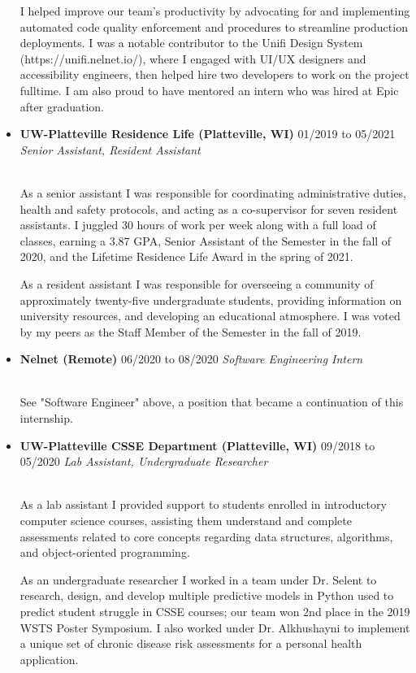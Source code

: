 \documentclass[11pt]{article}
\newcommand{\job}[3]{\vspace{1.5mm}
  \textbf{#1} \hfill #2 \linebreak \textit{#3}
}
\begin{document}
\begin{itemize}[leftmargin=*]
{I helped improve our team's productivity by advocating for and implementing automated code quality
enforcement and procedures to streamline production deployments. I was a notable contributor to the Unifi Design System (https://unifi.nelnet.io/), where I engaged with UI/UX designers and accessibility engineers, then helped hire two developers to work on the project fulltime. I am also proud to have mentored an intern who was hired at Epic after graduation.}
	\item[]
	      \job
	      {UW-Platteville Residence Life (Platteville, WI)}
	      {01/2019 to 05/2021}
	      {Senior Assistant, Resident Assistant}
	      {\\As a senior assistant I was responsible for coordinating administrative duties, health and safety protocols, and acting as a co-supervisor for seven resident assistants. I juggled 30 hours of work per week along with a full load of classes, earning a 3.87 GPA, Senior Assistant of the Semester in the fall of 2020, and the Lifetime Residence Life Award in the spring of 2021.\par
As a resident assistant I was responsible for overseeing a community of approximately twenty-five undergraduate students, providing information on university resources, and developing an educational atmosphere. I was voted by my peers as the Staff Member of the Semester in the fall of 2019.}
	\item[]
	      \job
	      {Nelnet (Remote)}
	      {06/2020 to 08/2020}
	      {Software Engineering Intern}
	      {\\See "Software Engineer" above, a position that became a continuation of this internship.}
	\item[]
	      \job
	      {UW-Platteville CSSE Department (Platteville, WI)}
	      {09/2018 to 05/2020}
	      {Lab Assistant, Undergraduate Researcher}
	      {\\As a lab assistant I provided support to students enrolled in introductory computer science courses, assisting them understand and complete assessments related to core concepts regarding data structures, algorithms, and object-oriented programming.\par
As an undergraduate researcher I worked in a team under Dr. Selent to research, design, and develop multiple predictive models in Python used to predict student struggle in CSSE courses; our team won 2nd place in the 2019 WSTS Poster Symposium. I also worked under Dr. Alkhushayni to implement a unique set of chronic disease risk assessments for a personal health application.}
\end{itemize}
\end{document}
